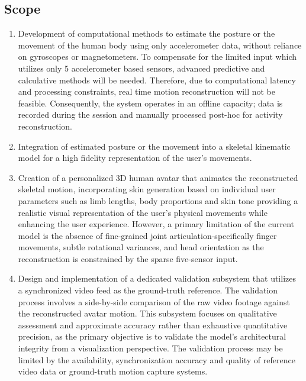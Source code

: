 \documentclass[12pt, a4paper, oneside]{report}
\begin{document}
\subsection{Scope}
\begin{enumerate}[leftmargin=*, itemsep=1.5em]
    \item Development of computational methods to estimate the posture or the movement of the human body using only accelerometer data, without reliance on gyroscopes or magnetometers. To compensate for the limited input which utilizes only 5 accelerometer based sensors, advanced predictive and calculative methods will be needed. Therefore, due to computational latency and processing constraints, real time motion reconstruction will not be feasible. Consequently, the system operates in an offline capacity; data is recorded during the session and manually processed post-hoc for activity reconstruction.
    
    \item Integration of estimated posture or the movement into a skeletal kinematic model for a high fidelity representation of the user’s movements.
    
    \item Creation of a personalized 3D human avatar that animates the reconstructed skeletal motion, incorporating skin generation based on individual user parameters such as limb lengths, body proportions and skin tone providing a realistic visual representation of the user’s physical movements while enhancing the user experience. However, a primary limitation of the current model is the absence of fine-grained joint articulation-specifically finger movements, subtle rotational variances, and head orientation as the reconstruction is constrained by the sparse five-sensor input.
    
    \item Design and implementation of a dedicated validation subsystem that utilizes a synchronized video feed as the ground-truth reference. The validation process involves a side-by-side comparison of the raw video footage against the reconstructed avatar motion. This subsystem focuses on qualitative assessment and approximate accuracy rather than exhaustive quantitative precision, as the primary objective is to validate the model's architectural integrity from a visualization perspective. The validation process may be limited by the availability, synchronization accuracy and quality of reference video data or ground-truth motion capture systems.
\end{enumerate}
\end{document}
